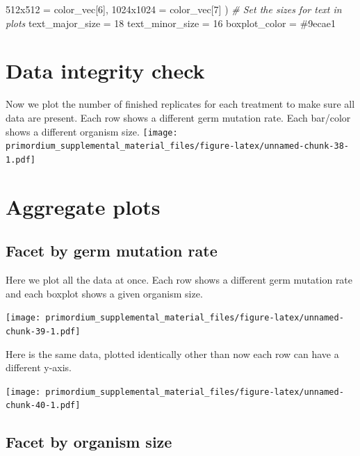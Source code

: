\documentclass[
]{book}
\newenvironment{Shaded}{\begin{snugshade}}{\end{snugshade}}
\newcommand{\CommentTok}[1]{\textcolor[rgb]{0.56,0.35,0.01}{\textit{#1}}}
\newcommand{\DecValTok}[1]{\textcolor[rgb]{0.00,0.00,0.81}{#1}}
\newcommand{\NormalTok}[1]{#1}
\newcommand{\StringTok}[1]{\textcolor[rgb]{0.31,0.60,0.02}{#1}}
\begin{document}
\begin{Shaded}
\begin{Highlighting}[]
  \StringTok{\textquotesingle{}512x512\textquotesingle{}}\NormalTok{ =}\StringTok{   }\NormalTok{color\_vec[}\DecValTok{6}\NormalTok{],}
  \StringTok{\textquotesingle{}1024x1024\textquotesingle{}}\NormalTok{ =}\StringTok{ }\NormalTok{color\_vec[}\DecValTok{7}\NormalTok{]}
\NormalTok{)}
\CommentTok{\# Set the sizes for text in plots}
\NormalTok{text\_major\_size =}\StringTok{ }\DecValTok{18}
\NormalTok{text\_minor\_size =}\StringTok{ }\DecValTok{16} 
\NormalTok{boxplot\_color =}\StringTok{ \textquotesingle{}\#9ecae1\textquotesingle{}}
\end{Highlighting}
\end{Shaded}

\hypertarget{data-integrity-check-2}{%
\section{Data integrity check}\label{data-integrity-check-2}}

Now we plot the number of finished replicates for each treatment to make sure all data are present.
Each row shows a different germ mutation rate.
Each bar/color shows a different organism size.
\texttt{[image: primordium\_supplemental\_material\_files/figure-latex/unnamed-chunk-38-1.pdf]}

\hypertarget{aggregate-plots-2}{%
\section{Aggregate plots}\label{aggregate-plots-2}}

\hypertarget{facet-by-germ-mutation-rate}{%
\subsection{Facet by germ mutation rate}\label{facet-by-germ-mutation-rate}}

Here we plot all the data at once.
Each row shows a different germ mutation rate and each boxplot shows a given organism size.

\texttt{[image: primordium\_supplemental\_material\_files/figure-latex/unnamed-chunk-39-1.pdf]}

Here is the same data, plotted identically other than now each row can have a different y-axis.

\texttt{[image: primordium\_supplemental\_material\_files/figure-latex/unnamed-chunk-40-1.pdf]}

\hypertarget{facet-by-organism-size-1}{%
\subsection{Facet by organism size}\label{facet-by-organism-size-1}}
\end{document}

